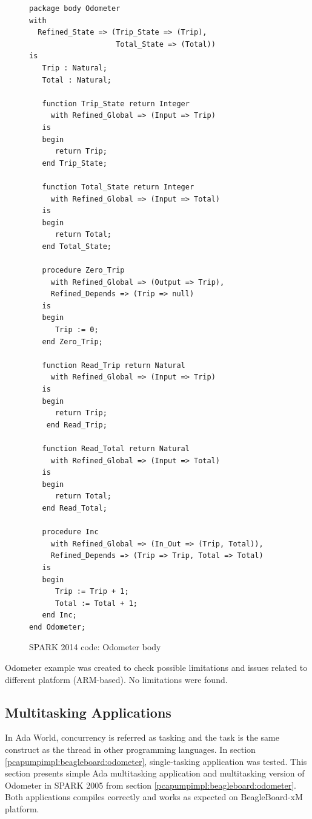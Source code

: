 \begin{figure}
\singlespacing
\begin{lstlisting}[language=ada2012, frame=single, gobble=0]
package body Odometer
with
  Refined_State => (Trip_State => (Trip),
                    Total_State => (Total))
is
   Trip : Natural;
   Total : Natural;

   function Trip_State return Integer
     with Refined_Global => (Input => Trip)
   is
   begin
      return Trip;
   end Trip_State;

   function Total_State return Integer
     with Refined_Global => (Input => Total)
   is
   begin
      return Total;
   end Total_State;

   procedure Zero_Trip
     with Refined_Global => (Output => Trip),
     Refined_Depends => (Trip => null)
   is
   begin
      Trip := 0;
   end Zero_Trip;

   function Read_Trip return Natural
     with Refined_Global => (Input => Trip)
   is
   begin
      return Trip;
    end Read_Trip;

   function Read_Total return Natural
     with Refined_Global => (Input => Total)
   is
   begin
      return Total;
   end Read_Total;

   procedure Inc
     with Refined_Global => (In_Out => (Trip, Total)),
     Refined_Depends => (Trip => Trip, Total => Total)
   is
   begin
      Trip := Trip + 1;
      Total := Total + 1;
   end Inc;
end Odometer;
\end{lstlisting}
\doublespacing
\caption{SPARK 2014 code: Odometer body}
\label{listing:Odometer2014_body}
\end{figure}

Odometer example was created to check possible limitations and issues related to different platform (ARM-based). No limitations were found.


\subsection{Multitasking Applications}
\label{pcapumpimpl:beagleboard:multitasking}

In Ada World, concurrency is referred as tasking and the task is the same construct as the thread in other programming languages. In section \ref{pcapumpimpl:beagleboard:odometer}, single-tasking application was tested. This section presents simple Ada multitasking application and multitasking version of Odometer in SPARK 2005 from section \ref{pcapumpimpl:beagleboard:odometer}. Both applications compiles correctly and works as expected on BeagleBoard-xM platform.

